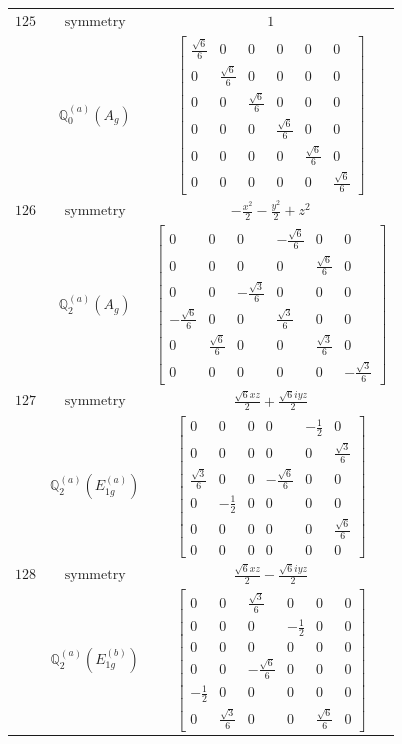 \documentclass[fleqn,8pt,landscape]{jsarticle}
\begin{document}
\begin{longtable}{ccc}
$ 125 $ & $ \text{symmetry} $ & $ 1 $ \\
$  $ & $ \mathbb{Q}_{0}^{(a)}(A_{g}) $ & $ \begin{bmatrix} \frac{\sqrt{6}}{6} & 0 & 0 & 0 & 0 & 0 \\ 0 & \frac{\sqrt{6}}{6} & 0 & 0 & 0 & 0 \\ 0 & 0 & \frac{\sqrt{6}}{6} & 0 & 0 & 0 \\ 0 & 0 & 0 & \frac{\sqrt{6}}{6} & 0 & 0 \\ 0 & 0 & 0 & 0 & \frac{\sqrt{6}}{6} & 0 \\ 0 & 0 & 0 & 0 & 0 & \frac{\sqrt{6}}{6} \end{bmatrix} $ \\ \hline
$ 126 $ & $ \text{symmetry} $ & $ - \frac{x^{2}}{2} - \frac{y^{2}}{2} + z^{2} $ \\
$  $ & $ \mathbb{Q}_{2}^{(a)}(A_{g}) $ & $ \begin{bmatrix} 0 & 0 & 0 & - \frac{\sqrt{6}}{6} & 0 & 0 \\ 0 & 0 & 0 & 0 & \frac{\sqrt{6}}{6} & 0 \\ 0 & 0 & - \frac{\sqrt{3}}{6} & 0 & 0 & 0 \\ - \frac{\sqrt{6}}{6} & 0 & 0 & \frac{\sqrt{3}}{6} & 0 & 0 \\ 0 & \frac{\sqrt{6}}{6} & 0 & 0 & \frac{\sqrt{3}}{6} & 0 \\ 0 & 0 & 0 & 0 & 0 & - \frac{\sqrt{3}}{6} \end{bmatrix} $ \\ \hline
$ 127 $ & $ \text{symmetry} $ & $ \frac{\sqrt{6} x z}{2} + \frac{\sqrt{6} i y z}{2} $ \\
$  $ & $ \mathbb{Q}_{2}^{(a)}(E_{1g}^{(a)}) $ & $ \begin{bmatrix} 0 & 0 & 0 & 0 & - \frac{1}{2} & 0 \\ 0 & 0 & 0 & 0 & 0 & \frac{\sqrt{3}}{6} \\ \frac{\sqrt{3}}{6} & 0 & 0 & - \frac{\sqrt{6}}{6} & 0 & 0 \\ 0 & - \frac{1}{2} & 0 & 0 & 0 & 0 \\ 0 & 0 & 0 & 0 & 0 & \frac{\sqrt{6}}{6} \\ 0 & 0 & 0 & 0 & 0 & 0 \end{bmatrix} $ \\ \hline
$ 128 $ & $ \text{symmetry} $ & $ \frac{\sqrt{6} x z}{2} - \frac{\sqrt{6} i y z}{2} $ \\
$  $ & $ \mathbb{Q}_{2}^{(a)}(E_{1g}^{(b)}) $ & $ \begin{bmatrix} 0 & 0 & \frac{\sqrt{3}}{6} & 0 & 0 & 0 \\ 0 & 0 & 0 & - \frac{1}{2} & 0 & 0 \\ 0 & 0 & 0 & 0 & 0 & 0 \\ 0 & 0 & - \frac{\sqrt{6}}{6} & 0 & 0 & 0 \\ - \frac{1}{2} & 0 & 0 & 0 & 0 & 0 \\ 0 & \frac{\sqrt{3}}{6} & 0 & 0 & \frac{\sqrt{6}}{6} & 0 \end{bmatrix} $ \\ \hline

\end{longtable}
\end{document}
